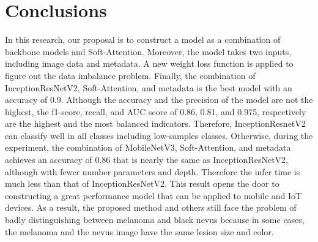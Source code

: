 \documentclass[sensors,article,accept,pdftex,moreauthors]{Definitions/mdpi}
\begin{document}
	\section{Conclusions}
	In this research, our proposal is to construct a model as a combination of backbone models and Soft-Attention. Moreover, the model takes two inputs, including image data and metadata. A new weight loss function is applied to figure out the data imbalance problem. Finally, the combination of InceptionResNetV2, Soft-Attention, and metadata is the best model with an accuracy of 0.9. Although the accuracy and the precision of the model are not the highest, the f1-score, recall, and AUC score of 0.86, 0.81, and 0.975, respectively are the highest and the most balanced indicators. Therefore, InceptionResnetV2 can classify well in all classes including low-samples classes. Otherwise, during the experiment, the combination of MobileNetV3, Soft-Attention, and metadata achieves an accuracy of 0.86 that is nearly the same as InceptionResNetV2, although with fewer number parameters and depth. Therefore the infer time is much less than that of  InceptionResNetV2. This result opens the door to constructing a great performance model that can be applied to mobile and IoT devices. {As a result, the proposed method and others still face the problem of badly distinguishing between melanoma and black nevus because in some cases, the melanoma and the nevus image have the same lesion size and color.}
	\vspace{6pt} 
	
	
	
	
\end{document}
